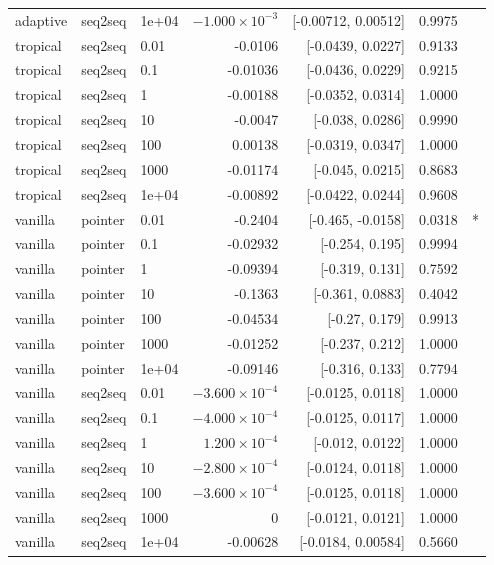 \documentclass[10pt]{article}
\begin{document}
{\begin{longtable}{lllrrrl}
adaptive & seq2seq & 1e+04 & $-1.000\times10^{-3}$ & [-0.00712, 0.00512] & 0.9975 & \\
tropical & seq2seq & 0.01 & -0.0106 & [-0.0439, 0.0227] & 0.9133 & \\
tropical & seq2seq & 0.1 & -0.01036 & [-0.0436, 0.0229] & 0.9215 & \\
tropical & seq2seq & 1 & -0.00188 & [-0.0352, 0.0314] & 1.0000 & \\
tropical & seq2seq & 10 & -0.0047 & [-0.038, 0.0286] & 0.9990 & \\
tropical & seq2seq & 100 & 0.00138 & [-0.0319, 0.0347] & 1.0000 & \\
tropical & seq2seq & 1000 & -0.01174 & [-0.045, 0.0215] & 0.8683 & \\
tropical & seq2seq & 1e+04 & -0.00892 & [-0.0422, 0.0244] & 0.9608 & \\
vanilla & pointer & 0.01 & -0.2404 & [-0.465, -0.0158] & 0.0318 & *\\
vanilla & pointer & 0.1 & -0.02932 & [-0.254, 0.195] & 0.9994 & \\
vanilla & pointer & 1 & -0.09394 & [-0.319, 0.131] & 0.7592 & \\
vanilla & pointer & 10 & -0.1363 & [-0.361, 0.0883] & 0.4042 & \\
vanilla & pointer & 100 & -0.04534 & [-0.27, 0.179] & 0.9913 & \\
vanilla & pointer & 1000 & -0.01252 & [-0.237, 0.212] & 1.0000 & \\
vanilla & pointer & 1e+04 & -0.09146 & [-0.316, 0.133] & 0.7794 & \\
vanilla & seq2seq & 0.01 & $-3.600\times10^{-4}$ & [-0.0125, 0.0118] & 1.0000 & \\
vanilla & seq2seq & 0.1 & $-4.000\times10^{-4}$ & [-0.0125, 0.0117] & 1.0000 & \\
vanilla & seq2seq & 1 & $1.200\times10^{-4}$ & [-0.012, 0.0122] & 1.0000 & \\
vanilla & seq2seq & 10 & $-2.800\times10^{-4}$ & [-0.0124, 0.0118] & 1.0000 & \\
vanilla & seq2seq & 100 & $-3.600\times10^{-4}$ & [-0.0125, 0.0118] & 1.0000 & \\
vanilla & seq2seq & 1000 & 0 & [-0.0121, 0.0121] & 1.0000 & \\
vanilla & seq2seq & 1e+04 & -0.00628 & [-0.0184, 0.00584] & 0.5660 & \\
\bottomrule
\end{longtable}
}
\end{document}
